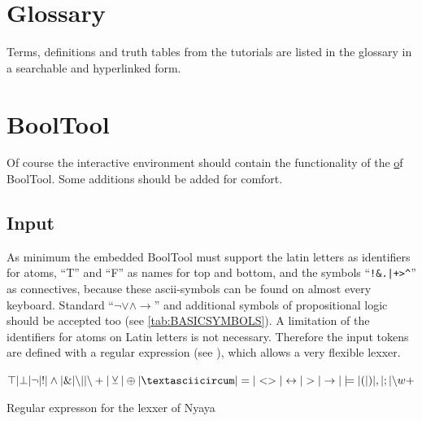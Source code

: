%
%


\section{Glossary}

Terms, definitions and truth tables from the tutorials are listed in the glossary in a searchable and hyperlinked form.

\section{BoolTool}

Of course the interactive environment should contain the functionality of the \href{web fronted} of BoolTool.
Some additions should be added for comfort.

\subsection{Input}

As minimum the embedded BoolTool must support the latin letters as identifiers for atoms, 
“T” and “F” as names for top and bottom, and the symbols
“\verb#!&.|+>^#” as connectives, because these ascii-symbols can be found on almost every keyboard.
Standard “$ \neg \vee \wedge \rightarrow $” and additional symbols of propositional logic
 should be accepted too (see \ref{tab:BASICSYMBOLS}).
A limitation of the identifiers for atoms on Latin letters is not necessary.
Therefore the input tokens are defined with a regular expression (see ),
which allows a very flexible lexxer.


\begin{table}[htdp]
\begin{center}
$\top | \bot 
| \neg | !
| \wedge | \&
| {\setminus}| | {\setminus}+
| \veebar | \oplus | \textasciicircum
| = | <> | \leftrightarrow 
| > | \rightarrow | \models
| ( | ) | , | ; 
| {\setminus}w+$ 
\caption{Regular expresson for the lexxer of Nyaya}
\label{tab:REGEX}
\end{center}
\end{table}%



